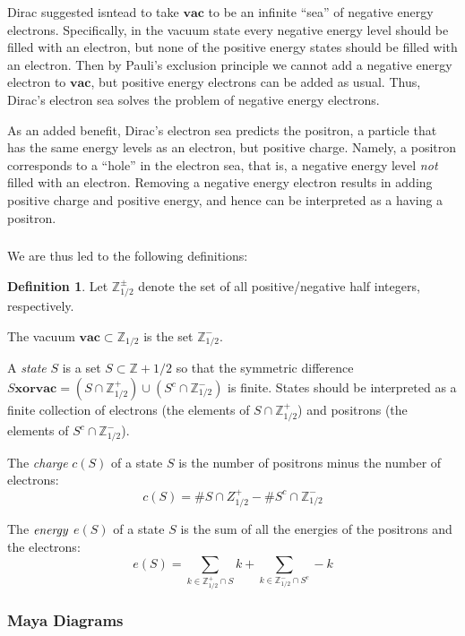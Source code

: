\documentclass{amsart}[12pt]
\theoremstyle{definition}
\newtheorem{definition}[dummy]{Definition}
\newcommand{\Z}{\mathbb{Z}}
\newcommand{\vac}{\mathbf{vac}}
\begin{document}
Dirac suggested isntead to take $\vac$ to be an
infinite ``sea'' of negative energy electrons.   Specifically, in the vacuum state every negative energy level should be filled with an electron, but none of the positive energy states should be filled with an electron.  Then by Pauli's
exclusion principle we cannot add a negative energy electron
to $\vac$, but positive energy electrons can be added as usual.  Thus, Dirac's electron sea solves the problem of negative energy electrons.

As an added benefit, Dirac's electron sea predicts the positron, a particle
that has the same energy levels as an electron, but positive charge.  Namely, a positron corresponds to a ``hole'' in the electron sea, that is, a negative
energy level \emph{not} filled with an electron.  Removing a negative energy electron results in adding positive charge and positive energy, and hence can be interpreted as a having a positron.

\subsubsection{} We are thus led to the following definitions:

\begin{definition} Let $\Z_{1/2}^\pm$ denote the set of all positive/negative half integers, respectively.

The vacuum $\vac\subset \Z_{1/2}$ is the set $\Z_{1/2}^-$.

A \emph{state} $S$ is a set $S\subset\Z+1/2$ so that the symmetric
difference $S \textbf{xor} \vac=(S\cap\Z_{1/2}^+)\cup (S^c\cap\Z_{1/2}^-)$ is finite.  States should be interpreted as a finite collection of electrons (the elements of $S\cap \Z^+_{1/2}$) and positrons (the elements of $S^c\cap \Z^-_{1/2}$).

The \emph{charge} $c(S)$ of a state $S$ is the number of positrons minus the number of electrons:
$$c(S)=\# S\cap Z^+_{1/2} - \# S^c\cap \Z^-_{1/2}$$

The $\emph{energy}$ $e(S)$ of a state $S$ is the sum of all the energies of the positrons and the electrons:
$$e(S)=\sum_{k\in\Z^+_{1/2}\cap S} k +\sum_{k\in\Z^-_{1/2}\cap S^c} -k$$

\end{definition}

\subsubsection{Maya Diagrams}
\end{document}
